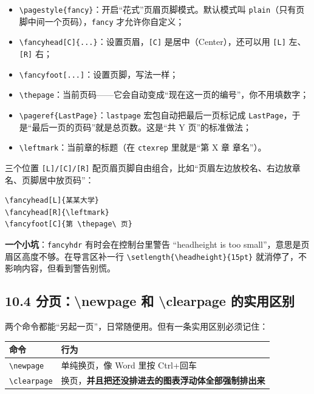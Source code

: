 \begin{itemize}
\setlength{\itemsep}{2pt}
\item \texttt{\textbackslash{}pagestyle\{fancy\}}：开启“花式”页眉页脚模式。默认模式叫 \texttt{plain}（只有页脚中间一个页码），\texttt{fancy} 才允许你自定义；
\item \texttt{\textbackslash{}fancyhead[C]\{...\}}：设置页眉，\texttt{[C]} 是居中（Center），还可以用 \texttt{[L]} 左、\texttt{[R]} 右；
\item \texttt{\textbackslash{}fancyfoot[...]}：设置页脚，写法一样；
\item \texttt{\textbackslash{}thepage}：当前页码——它会自动变成“现在这一页的编号”，你不用填数字；
\item \texttt{\textbackslash{}pageref\{LastPage\}}：\texttt{lastpage} 宏包自动把最后一页标记成 \texttt{LastPage}，于是“最后一页的页码”就是总页数。这是“共 Y 页”的标准做法；
\item \texttt{\textbackslash{}leftmark}：当前章的标题（在 \texttt{ctexrep} 里就是“第 X 章 章名”）。
\end{itemize}

三个位置 \texttt{[L]/[C]/[R]} 配页眉页脚自由组合，比如“页眉左边放校名、右边放章名、页脚居中放页码”：

\begin{lstlisting}
\fancyhead[L]{某某大学}
\fancyhead[R]{\leftmark}
\fancyfoot[C]{第 \thepage\ 页}
\end{lstlisting}

\textbf{一个小坑}：\texttt{fancyhdr} 有时会在控制台里警告 “headheight is too small”，意思是页眉区高度不够。在导言区补一行 \texttt{\textbackslash{}setlength\{\textbackslash{}headheight\}\{15pt\}} 就消停了，不影响内容，但看到警告别慌。

\subsection*{10.4 分页：\textbackslash{}newpage 和 \textbackslash{}clearpage 的实用区别}

两个命令都能“另起一页”，日常随便用。但有一条实用区别必须记住：

\begin{table}[htbp]
\centering
\small
\begin{tabularx}{\linewidth}{@{}*{2}{>{\raggedright\arraybackslash}X}@{}}
\toprule
\textbf{命令} & \textbf{行为} \\
\midrule
\texttt{\textbackslash{}newpage} & 单纯换页，像 Word 里按 Ctrl+回车 \\
\texttt{\textbackslash{}clearpage} & 换页，\textbf{并且把还没排进去的图表浮动体全部强制排出来} \\
\bottomrule
\end{tabularx}
\end{table}

